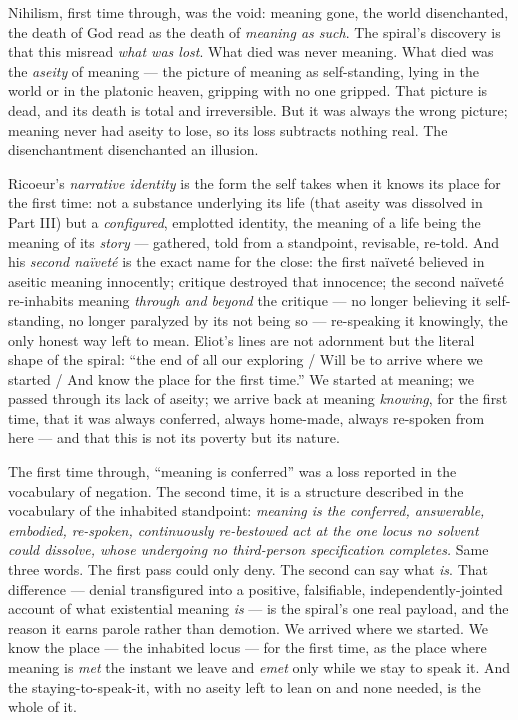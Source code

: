 \documentclass[11pt]{article}
\begin{document}
Nihilism, first time through, was the void: meaning gone, the world disenchanted, the death of God read as the death of \emph{meaning as such}. The spiral's discovery is that this misread \emph{what was lost}. What died was never meaning. What died was the \emph{aseity} of meaning — the picture of meaning as self-standing, lying in the world or in the platonic heaven, gripping with no one gripped. That picture is dead, and its death is total and irreversible. But it was always the wrong picture; meaning never had aseity to lose, so its loss subtracts nothing real. The disenchantment disenchanted an illusion.

Ricoeur's \emph{narrative identity} is the form the self takes when it knows its place for the first time: not a substance underlying its life (that aseity was dissolved in Part III) but a \emph{configured}, emplotted identity, the meaning of a life being the meaning of its \emph{story} — gathered, told from a standpoint, revisable, re-told. And his \emph{second naïveté} is the exact name for the close: the first naïveté believed in aseitic meaning innocently; critique destroyed that innocence; the second naïveté re-inhabits meaning \emph{through and beyond} the critique — no longer believing it self-standing, no longer paralyzed by its not being so — re-speaking it knowingly, the only honest way left to mean. Eliot's lines are not adornment but the literal shape of the spiral: ``the end of all our exploring /\allowbreak{} Will be to arrive where we started /\allowbreak{} And know the place for the first time.'' We started at meaning; we passed through its lack of aseity; we arrive back at meaning \emph{knowing}, for the first time, that it was always conferred, always home-made, always re-spoken from here — and that this is not its poverty but its nature.

The first time through, ``meaning is conferred'' was a loss reported in the vocabulary of negation. The second time, it is a structure described in the vocabulary of the inhabited standpoint: \emph{meaning is the conferred, answerable, embodied, re-spoken, continuously re-bestowed act at the one locus no solvent could dissolve, whose undergoing no third-person specification completes.} Same three words. The first pass could only deny. The second can say what \emph{is}. That difference — denial transfigured into a positive, falsifiable, independently-jointed account of what existential meaning \emph{is} — is the spiral's one real payload, and the reason it earns parole rather than demotion. We arrived where we started. We know the place — the inhabited locus — for the first time, as the place where meaning is \emph{met} the instant we leave and \emph{emet} only while we stay to speak it. And the staying-to-speak-it, with no aseity left to lean on and none needed, is the whole of it.
\end{document}
